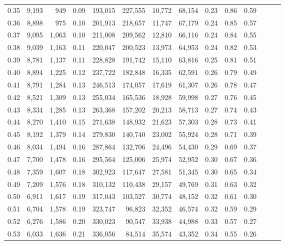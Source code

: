 \begin{tabular}{rrrrrrrrrrrrrr}
0.35 &  9,193 &    949 &  0.09 &  193,015 &  227,555 &  10,772 &  68,154 &  0.23 &  0.86 &      0.59 \\
0.36 &  8,898 &    975 &  0.10 &  201,913 &  218,657 &  11,747 &  67,179 &  0.24 &  0.85 &      0.57 \\
0.37 &  9,095 &  1,063 &  0.10 &  211,008 &  209,562 &  12,810 &  66,116 &  0.24 &  0.84 &      0.55 \\
0.38 &  9,039 &  1,163 &  0.11 &  220,047 &  200,523 &  13,973 &  64,953 &  0.24 &  0.82 &      0.53 \\
0.39 &  8,781 &  1,137 &  0.11 &  228,828 &  191,742 &  15,110 &  63,816 &  0.25 &  0.81 &      0.51 \\
0.40 &  8,894 &  1,225 &  0.12 &  237,722 &  182,848 &  16,335 &  62,591 &  0.26 &  0.79 &      0.49 \\
0.41 &  8,791 &  1,284 &  0.13 &  246,513 &  174,057 &  17,619 &  61,307 &  0.26 &  0.78 &      0.47 \\
0.42 &  8,521 &  1,309 &  0.13 &  255,034 &  165,536 &  18,928 &  59,998 &  0.27 &  0.76 &      0.45 \\
0.43 &  8,334 &  1,285 &  0.13 &  263,368 &  157,202 &  20,213 &  58,713 &  0.27 &  0.74 &      0.43 \\
0.44 &  8,270 &  1,410 &  0.15 &  271,638 &  148,932 &  21,623 &  57,303 &  0.28 &  0.73 &      0.41 \\
0.45 &  8,192 &  1,379 &  0.14 &  279,830 &  140,740 &  23,002 &  55,924 &  0.28 &  0.71 &      0.39 \\
0.46 &  8,034 &  1,494 &  0.16 &  287,864 &  132,706 &  24,496 &  54,430 &  0.29 &  0.69 &      0.37 \\
0.47 &  7,700 &  1,478 &  0.16 &  295,564 &  125,006 &  25,974 &  52,952 &  0.30 &  0.67 &      0.36 \\
0.48 &  7,359 &  1,607 &  0.18 &  302,923 &  117,647 &  27,581 &  51,345 &  0.30 &  0.65 &      0.34 \\
0.49 &  7,209 &  1,576 &  0.18 &  310,132 &  110,438 &  29,157 &  49,769 &  0.31 &  0.63 &      0.32 \\
0.50 &  6,911 &  1,617 &  0.19 &  317,043 &  103,527 &  30,774 &  48,152 &  0.32 &  0.61 &      0.30 \\
0.51 &  6,704 &  1,578 &  0.19 &  323,747 &   96,823 &  32,352 &  46,574 &  0.32 &  0.59 &      0.29 \\
0.52 &  6,276 &  1,586 &  0.20 &  330,023 &   90,547 &  33,938 &  44,988 &  0.33 &  0.57 &      0.27 \\
0.53 &  6,033 &  1,636 &  0.21 &  336,056 &   84,514 &  35,574 &  43,352 &  0.34 &  0.55 &      0.26 \\

\end{tabular}
